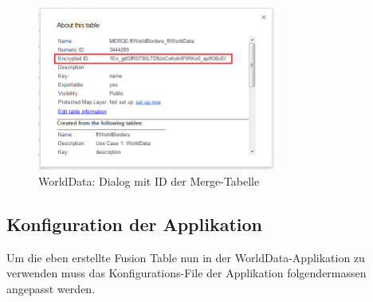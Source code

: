 \begin{figure}[H]
	\centering
	\includegraphics[width=0.7\textwidth]{images/usecase1-worlddata/documentation/worlddata-prepare_fusiontableslayer4}
	\caption{WorldData: Dialog mit ID der Merge-Tabelle}
	\label{worlddata-prepare_fusiontableslayer4}
\end{figure}

\subsection{Konfiguration der Applikation}
Um die eben erstellte Fusion Table nun in der WorldData-Applikation zu verwenden muss das Konfigurations-File der Applikation folgendermassen angepasst werden.

